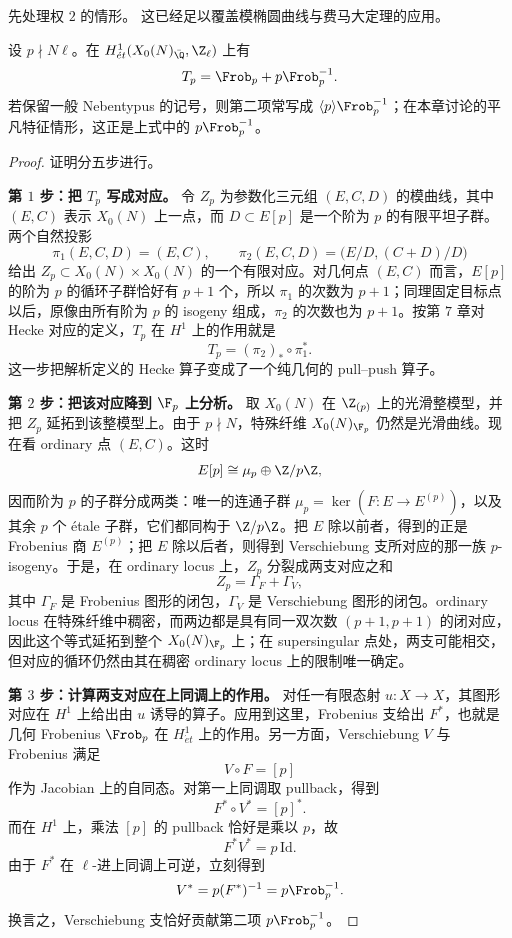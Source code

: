 先处理权 $2$ 的情形。
这已经足以覆盖模椭圆曲线与费马大定理的应用。

\begin{lemma}
\label{lem:ch09-eichler-shimura-etale}
设 $p \nmid N\ell$。在 $H^1_{\acute{e}t}(X_0(N)_{\bar{\Q}}, \Z_\ell)$ 上有
\[
T_p = \Frob_p + p\Frob_p^{-1}.
\]
若保留一般 Nebentypus 的记号，则第二项常写成 $\langle p \rangle \Frob_p^{-1}$；在本章讨论的平凡特征情形，这正是上式中的 $p\Frob_p^{-1}$。
\end{lemma}

\begin{proof}
证明分五步进行。

\textbf{第 $1$ 步：把 $T_p$ 写成对应。}
令 $Z_p$ 为参数化三元组 $(E,C,D)$ 的模曲线，其中 $(E,C)$ 表示 $X_0(N)$ 上一点，而 $D \subset E[p]$ 是一个阶为 $p$ 的有限平坦子群。两个自然投影
\[
\pi_1(E,C,D)=(E,C),\qquad \pi_2(E,C,D)=\bigl(E/D,(C+D)/D\bigr)
\]
给出 $Z_p \subset X_0(N)\times X_0(N)$ 的一个有限对应。对几何点 $(E,C)$ 而言，$E[p]$ 的阶为 $p$ 的循环子群恰好有 $p+1$ 个，所以 $\pi_1$ 的次数为 $p+1$；同理固定目标点以后，原像由所有阶为 $p$ 的 isogeny 组成，$\pi_2$ 的次数也为 $p+1$。按第 $7$ 章对 Hecke 对应的定义，$T_p$ 在 $H^1$ 上的作用就是
\[
T_p=(\pi_2)_*\circ \pi_1^*.
\]
这一步把解析定义的 Hecke 算子变成了一个纯几何的 pull--push 算子。

\textbf{第 $2$ 步：把该对应降到 $\F_p$ 上分析。}
取 $X_0(N)$ 在 $\Z_{(p)}$ 上的光滑整模型，并把 $Z_p$ 延拓到该整模型上。由于 $p \nmid N$，特殊纤维 $X_0(N)_{\F_p}$ 仍然是光滑曲线。现在看 ordinary 点 $(E,C)$。这时
\[
E[p]\cong \mu_p\oplus \Z/p\Z,
\]
因而阶为 $p$ 的子群分成两类：唯一的连通子群 $\mu_p=\ker(F\colon E\to E^{(p)})$，以及其余 $p$ 个 étale 子群，它们都同构于 $\Z/p\Z$。把 $E$ 除以前者，得到的正是 Frobenius 商 $E^{(p)}$；把 $E$ 除以后者，则得到 Verschiebung 支所对应的那一族 $p$-isogeny。于是，在 ordinary locus 上，$Z_p$ 分裂成两支对应之和
\[
Z_p=\Gamma_F+\Gamma_V,
\]
其中 $\Gamma_F$ 是 Frobenius 图形的闭包，$\Gamma_V$ 是 Verschiebung 图形的闭包。ordinary locus 在特殊纤维中稠密，而两边都是具有同一双次数 $(p+1,p+1)$ 的闭对应，因此这个等式延拓到整个 $X_0(N)_{\F_p}$ 上；在 supersingular 点处，两支可能相交，但对应的循环仍然由其在稠密 ordinary locus 上的限制唯一确定。

\textbf{第 $3$ 步：计算两支对应在上同调上的作用。}
对任一有限态射 $u\colon X\to X$，其图形对应在 $H^1$ 上给出由 $u$ 诱导的算子。应用到这里，Frobenius 支给出 $F^*$，也就是几何 Frobenius $\Frob_p$ 在 $H^1_{\acute{e}t}$ 上的作用。另一方面，Verschiebung $V$ 与 Frobenius 满足
\[
V\circ F=[p]
\]
作为 Jacobian 上的自同态。对第一上同调取 pullback，得到
\[
F^*\circ V^*=[p]^*.
\]
而在 $H^1$ 上，乘法 $[p]$ 的 pullback 恰好是乘以 $p$，故
\[
F^*V^*=p\,\mathrm{Id}.
\]
由于 $F^*$ 在 $\ell$-进上同调上可逆，立刻得到
\[
V^*=p(F^*)^{-1}=p\Frob_p^{-1}.
\]
换言之，Verschiebung 支恰好贡献第二项 $p\Frob_p^{-1}$。


\end{proof}
